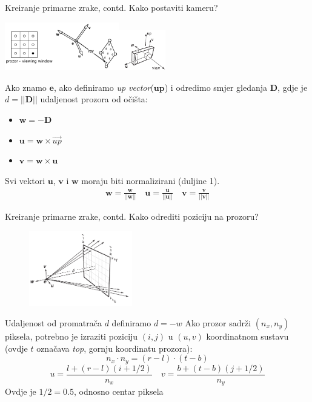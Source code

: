 \documentclass[9pt]{beamer}
\begin{document}
\begin{frame}{Kreiranje primarne zrake, contd.}
Kako postaviti kameru?
\begin{center}
\includegraphics[width=5cm]{slike/ray_viewing_window.png}\quad \includegraphics[width=2cm]{slike/ray_camera.png}
\end{center}

Ako znamo $\textbf{e}$, ako definiramo \textit{up vector}($\textbf{up}$) i odredimo smjer gledanja $\textbf{D}$, gdje je $d=||\textbf{D}||$ udaljenost prozora od očišta:
\begin{itemize}
\item $\textbf{w} = -\textbf{D}$
\item $\textbf{u} = \textbf{w}\times \vec{up}$
\item $\textbf{v} = \textbf{w}\times \textbf{u}$
\end{itemize}
Svi vektori $\textbf{u}$, $\textbf{v}$ i $\textbf{w}$ moraju biti normalizirani (duljine 1).
\begin{align*}
\textbf{w} = \frac{\textbf{w}}{||\textbf{w}||} \quad \textbf{u} = \frac{\textbf{u}}{||\textbf{u}||} 
\quad \textbf{v} = \frac{\textbf{v}}{||\textbf{v}||}
\end{align*}

\end{frame}

\begin{frame}{Kreiranje primarne zrake, contd.}
Kako  odrediti poziciju na prozoru?
\begin{figure}
\includegraphics[width=0.4\textwidth]{slike/ray_viewing_window_perspective.png} 
\end{figure}
Udaljenost od promatrača $d$ definiramo $d = -w$
Ako prozor sadrži $(n_x,n_y)$ piksela, potrebno je izraziti poziciju $(i,j)$ u $(u,v)$ koordinatnom sustavu (ovdje $t$ označava \textit{top}, gornju koordinatu prozora):
$$n_x \cdot n_y = (r-l) \cdot (t-b)$$
$$
u = \frac{l + (r-l)(i+1/2)}{n_x}\quad v = \frac{b + (t-b)(j+1/2)}{n_y}
$$
Ovdje je $1/2=0.5$, odnosno centar piksela
\end{frame}
\end{document}
